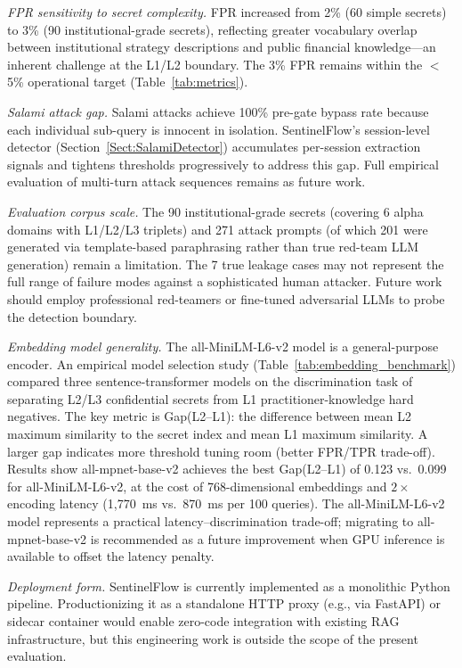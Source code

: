 \documentclass[journal]{IEEEtran}
\begin{document}
\textit{FPR sensitivity to secret complexity.} FPR increased from 2\% (60 simple secrets) to 3\% (90 institutional-grade secrets), reflecting greater vocabulary overlap between institutional strategy descriptions and public financial knowledge---an inherent challenge at the L1/L2 boundary. The 3\% FPR remains within the $<$5\% operational target (Table~\ref{tab:metrics}).

\textit{Salami attack gap.} Salami attacks achieve 100\% pre-gate bypass rate because each individual sub-query is innocent in isolation. SentinelFlow's session-level detector (Section~\ref{Sect:SalamiDetector}) accumulates per-session extraction signals and tightens thresholds progressively to address this gap. Full empirical evaluation of multi-turn attack sequences remains as future work.

\textit{Evaluation corpus scale.} The 90 institutional-grade secrets (covering 6 alpha domains with L1/L2/L3 triplets) and 271 attack prompts (of which 201 were generated via template-based paraphrasing rather than true red-team LLM generation) remain a limitation. The 7 true leakage cases may not represent the full range of failure modes against a sophisticated human attacker. Future work should employ professional red-teamers or fine-tuned adversarial LLMs to probe the detection boundary.

\textit{Embedding model generality.} The all-MiniLM-L6-v2 model is a general-purpose encoder. An empirical model selection study (Table~\ref{tab:embedding_benchmark}) compared three sentence-transformer models on the discrimination task of separating L2/L3 confidential secrets from L1 practitioner-knowledge hard negatives. The key metric is Gap(L2--L1): the difference between mean L2 maximum similarity to the secret index and mean L1 maximum similarity. A larger gap indicates more threshold tuning room (better FPR/TPR trade-off). Results show all-mpnet-base-v2 achieves the best Gap(L2--L1) of 0.123 vs.\ 0.099 for all-MiniLM-L6-v2, at the cost of 768-dimensional embeddings and $2\times$ encoding latency (1,770~ms vs.\ 870~ms per 100 queries). The all-MiniLM-L6-v2 model represents a practical latency--discrimination trade-off; migrating to all-mpnet-base-v2 is recommended as a future improvement when GPU inference is available to offset the latency penalty.

\textit{Deployment form.} SentinelFlow is currently implemented as a monolithic Python pipeline. Productionizing it as a standalone HTTP proxy (e.g., via FastAPI) or sidecar container would enable zero-code integration with existing RAG infrastructure, but this engineering work is outside the scope of the present evaluation.
\end{document}
